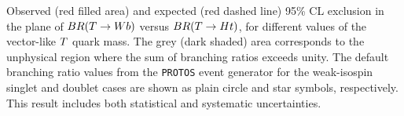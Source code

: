 Observed (red filled area) and expected (red dashed line) 95\% CL exclusion in the plane of
$BR(\T \to Wb)$ versus $BR(\T \to Ht)$, for different values of the vector-like $\T$ quark mass.
The grey (dark shaded) area corresponds to the unphysical region where the sum of branching ratios exceeds unity. 
The default branching ratio values from the \texttt{PROTOS} event generator for the weak-isospin singlet and doublet cases 
are shown as plain circle and star symbols, respectively. This result includes both statistical and systematic uncertainties.
